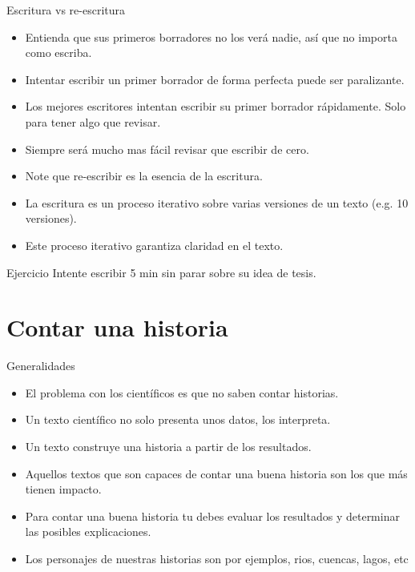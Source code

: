 \documentclass[
10pt,
aspectratio=169,
]{beamer}
\begin{document}
\begin{frame}[c]{Escritura vs re-escritura}
\begin{itemize}
\item Entienda que sus primeros borradores no los ver\'a nadie, as\'i que no importa como escriba. 
\item Intentar escribir un primer borrador de forma perfecta puede ser paralizante.
\item Los mejores escritores intentan escribir su primer borrador r\'apidamente. Solo para tener algo que revisar.
\item \alert{Siempre ser\'a mucho mas f\'acil revisar que escribir de cero.}
\item \alert{Note que re-escribir es la esencia de la escritura.}
\item La escritura es un proceso iterativo sobre varias versiones de un texto (e.g. 10 versiones). 
\item Este proceso iterativo garantiza claridad en el texto. 
\end{itemize}
\end{frame}


\begin{frame}[c]{Ejercicio}
Intente escribir 5 min sin parar sobre su idea de tesis. 
\end{frame}


\section{Contar una historia}

\begin{frame}[c]{Generalidades}
\begin{itemize}
\item El problema con los cient\'ificos es que no saben contar historias.
\item Un texto cient\'ifico no solo presenta unos datos, los interpreta. 
\item \alert{Un texto construye una historia a partir de los resultados.}
\item Aquellos textos que son capaces de contar una buena historia son los que m\'as tienen impacto.
\item Para contar una buena historia tu debes evaluar los resultados y determinar las posibles explicaciones.
\item Los personajes de nuestras historias son por ejemplos, rios, cuencas, lagos, etc
\end{itemize}
\end{frame}
\end{document}
